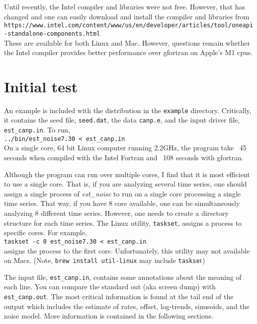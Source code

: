 \documentclass[12pt]{amsart}
\begin{document}
Until recently, the Intel compiler and libraries were not free.  However, that has changed and one can easily download
and install the compiler and libraries from
\tiny{
\\
 \texttt{https://www.intel.com/content/www/us/en/developer/articles/tool/oneapi-standalone-components.html}
 \\
 }
 \normalsize{ }
 These are available for both Linux and Mac. However, questions remain whether the Intel compiler provides better
 performance over gfortran on Apple's M1 cpus.
 
\section{Initial test}

An example is included with the distribution in the \texttt{example} directory. Critically, it contains the seed file, \texttt{seed.dat}, the data \texttt{canp.e}, and the
input driver file, \texttt{est\_canp.in}. To run,
\\
\texttt{../bin/est\_noise7.30 < est\_canp.in} \\
On a single core, 64 bit Linux computer running 2.2GHz, the program take ~45 seconds when compiled with the Intel Fortran and ~108 seconds with gfortran.

Although the program can run over multiple cores, I find that it is most efficient to use a single core.  That is, if you are 
analyzing several time series, one should assign a single process of \textit{est\_noise} to run on a single core processing
a single time series. That way, if you have 8 core available, one can be simultaneously analyzing 8 different time series. However, one needs to
create a directory structure for each time series. The Linux utility, \texttt{taskset}, assigns a process to specific cores. For example,
\\
\texttt{taskset -c 0 est\_noise7.30 < est\_canp.in}\\
assigns the process to the first core.  Unfortunately, this utility may not available on Macs. (Note,  \texttt{brew install util-linux} may
include \texttt{taskse}t)

The input file, \texttt{est\_canp.in}, contains some annotations about the meaning of each line.  You can compare
the standard out (aka screen dump) with \texttt{est\_canp.out}.  The most critical information is found at the tail
end of the output which includes the estimate of rates, offset, log-trends, sinusoids, and the noise model.  More information
is contained in the following sections.
\end{document}
